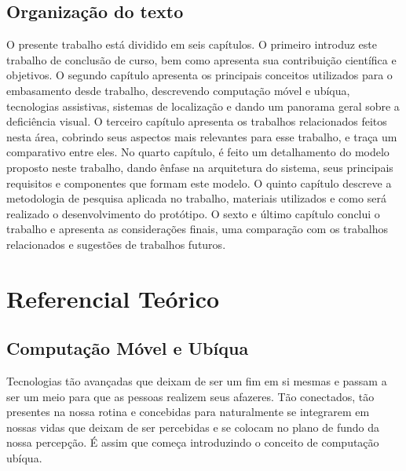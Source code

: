 \documentclass[english,brazilian]{UNISINOSmonografia}
\begin{document}
	\section{Organização do texto}
O presente trabalho está dividido em seis capítulos. O primeiro introduz este trabalho de conclusão de curso, bem como apresenta sua contribuição científica e objetivos.
O segundo capítulo apresenta os principais conceitos utilizados para o embasamento desde trabalho, descrevendo computação móvel e ubíqua, tecnologias assistivas, sistemas de localização e dando um panorama geral sobre a deficiência visual.
O terceiro capítulo apresenta os trabalhos relacionados feitos nesta área, cobrindo seus aspectos mais relevantes para esse trabalho, e traça um comparativo entre eles.
No quarto capítulo, é feito um detalhamento do modelo proposto neste trabalho, dando ênfase na arquitetura do sistema, seus principais requisitos e componentes que formam este modelo.
O quinto capítulo descreve a metodologia de pesquisa aplicada no trabalho, materiais utilizados e como será realizado o desenvolvimento do protótipo.
O sexto e último capítulo conclui o trabalho e apresenta as considerações finais, uma comparação com os trabalhos relacionados e sugestões de trabalhos futuros.

\chapter{Referencial Teórico}

	\section{Computação Móvel e Ubíqua}
Tecnologias tão avançadas que deixam de ser um fim em si mesmas e passam a ser um meio para que as pessoas realizem seus afazeres. Tão conectados, tão presentes na nossa rotina e concebidas para naturalmente se integrarem em nossas vidas que deixam de ser percebidas e se colocam no plano de fundo da nossa percepção. É assim que  começa introduzindo o conceito de computação ubíqua. 
\end{document}
